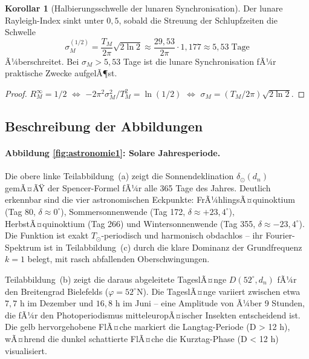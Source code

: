 ﻿\documentclass[12pt, a4paper]{article}
\theoremstyle{definition}
\newtheorem{korollar}[theorem]{Korollar}
\begin{document}
\begin{korollar}[Halbierungsschwelle der lunaren Synchronisation]\label{cor:lunar-half}
Der lunare Rayleigh-Index sinkt unter $0{,}5$, sobald die Streuung der Schlupfzeiten
die Schwelle
\begin{equation}\label{eq:sigma-half}
  \sigma_M^{(1/2)} = \frac{T_M}{2\pi}\sqrt{2\ln 2} \approx \frac{29{,}53}{2\pi}\cdot 1{,}177
  \approx 5{,}53\;\text{Tage}
\end{equation}
Ã¼berschreitet. Bei $\sigma_M > 5{,}53$ Tage ist die lunare Synchronisation fÃ¼r
praktische Zwecke aufgelÃ¶st.
\end{korollar}

\begin{proof}
$R_M^{\infty} = 1/2$ $\Leftrightarrow$ $-2\pi^2\sigma_M^2/T_M^2 = \ln(1/2)$
$\Leftrightarrow$ $\sigma_M = (T_M/2\pi)\sqrt{2\ln 2}$. \hfill
\end{proof}

\subsection{Beschreibung der Abbildungen}

\paragraph{Abbildung \ref{fig:astronomie1}: Solare Jahresperiode.}
Die obere linke Teilabbildung~(a) zeigt die Sonnendeklination $\delta_{\odot}(d_n)$
gemÃ¤ÃŸ der Spencer-Formel fÃ¼r alle 365 Tage des Jahres.
Deutlich erkennbar sind die vier astronomischen Eckpunkte: FrÃ¼hlingsÃ¤quinoktium
(Tag 80, $\delta \approx 0^\circ$), Sommersonnenwende (Tag 172, $\delta \approx +23{,}4^\circ$),
HerbstÃ¤quinoktium (Tag 266) und Wintersonnenwende (Tag 355, $\delta \approx -23{,}4^\circ$).
Die Funktion ist exakt $T_{\odot}$-periodisch und harmonisch obdachlos -- ihr
Fourier-Spektrum ist in Teilabbildung~(c) durch die klare Dominanz der
Grundfrequenz $k=1$ belegt, mit rasch abfallenden Oberschwingungen.

Teilabbildung~(b) zeigt die daraus abgeleitete TageslÃ¤nge $D(52^\circ, d_n)$ fÃ¼r
den Breitengrad Bielefelds ($\varphi = 52^\circ$N). Die TageslÃ¤nge variiert zwischen
etwa $7{,}7$ h im Dezember und $16{,}8$ h im Juni -- eine Amplitude von Ã¼ber
9 Stunden, die fÃ¼r den Photoperiodismus mitteleuropÃ¤ischer Insekten entscheidend ist.
Die gelb hervorgehobene FlÃ¤che markiert die Langtag-Periode (D > 12 h), wÃ¤hrend
die dunkel schattierte FlÃ¤che die Kurztag-Phase (D < 12 h) visualisiert.
\end{document}
